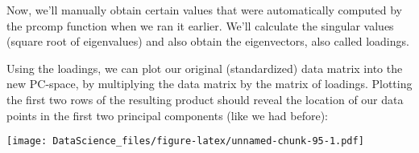 \documentclass[
]{book}
\newenvironment{Shaded}{\begin{snugshade}}{\end{snugshade}}
\newcommand{\AttributeTok}[1]{\textcolor[rgb]{0.77,0.63,0.00}{#1}}
\newcommand{\FunctionTok}[1]{\textcolor[rgb]{0.00,0.00,0.00}{#1}}
\newcommand{\NormalTok}[1]{#1}
\newcommand{\OtherTok}[1]{\textcolor[rgb]{0.56,0.35,0.01}{#1}}
\newcommand{\SpecialCharTok}[1]{\textcolor[rgb]{0.00,0.00,0.00}{#1}}
\newcommand{\StringTok}[1]{\textcolor[rgb]{0.31,0.60,0.02}{#1}}
\begin{document}
Now, we'll manually obtain certain values that were automatically computed by the prcomp function when we ran it earlier. We'll calculate the singular values (square root of eigenvalues) and also obtain the eigenvectors, also called loadings.

\begin{Shaded}
\end{Shaded}

Using the loadings, we can plot our original (standardized) data matrix into the new PC-space, by multiplying the data matrix by the matrix of loadings. Plotting the first two rows of the resulting product should reveal the location of our data points in the first two principal components (like we had before):

\begin{Shaded}
\end{Shaded}

\texttt{[image: DataScience\_files/figure-latex/unnamed-chunk-95-1.pdf]}
\end{document}
